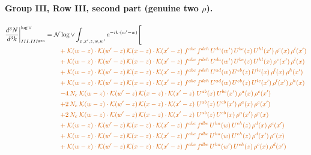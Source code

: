 \documentclass[10pt]{article}
\numberwithin{equation}{section}
\newcommand{\NNv}{\mathcal N\log\vee}
\begin{document}
\paragraph{Group III, Row III, second part (genuine two $\rho$).}
\begin{align}
\frac{d^3N}{d^3k}\bigg|^{\log\vee}_{III.III^{\rm gen}}={}&\NNv\int_{x,x',z,w,w'}e^{-ik\cdot(w'-w)}\Bigg[\notag\\
&\quad{\color{BFK}+\;\mathcal{K}(w-z)\cdot\mathcal{K}(w'-z)\,\mathcal{K}(x-z)\cdot\mathcal{K}(x'-z)\;f^{abc}\,f^{deh}\,U^{da}(w')\,U^{be}(z)\,U^{hl}(x')\,\rho^{c}(x)\,\rho^{l}(x')}\notag\\
&\quad{\color{BFK}+\;\mathcal{K}(w-z)\cdot\mathcal{K}(w'-z)\,\mathcal{K}(x-z)\cdot\mathcal{K}(x'-z)\;f^{abc}\,f^{deh}\,U^{da}(w')\,U^{be}(z)\,U^{hl}(x)\,\rho^{c}(x')\,\rho^{l}(x)}\notag\\
&\quad{\color{BFK}+\;\mathcal{K}(w-z)\cdot\mathcal{K}(w'-z)\,\mathcal{K}(x-z)\cdot\mathcal{K}(x'-z)\;f^{abc}\,f^{deh}\,U^{ad}(w)\,U^{eb}(z)\,U^{lc}(x)\,\rho^{l}(x)\,\rho^{h}(x')}\notag\\
&\quad{\color{BFK}+\;\mathcal{K}(w-z)\cdot\mathcal{K}(w'-z)\,\mathcal{K}(x-z)\cdot\mathcal{K}(x'-z)\;f^{abc}\,f^{deh}\,U^{ad}(w)\,U^{eb}(z)\,U^{lc}(x')\,\rho^{l}(x')\,\rho^{h}(x)}\notag\\
&\quad{\color{BFK}-4\,N_c\;\mathcal{K}(w-z)\cdot\mathcal{K}(w'-z)\,\mathcal{K}(x-z)\cdot\mathcal{K}(x'-z)\;U^{ab}(x)\,U^{bc}(x')\,\rho^{a}(x)\,\rho^{c}(x')}\notag\\
&\quad{\color{BFK}+2\,N_c\;\mathcal{K}(w-z)\cdot\mathcal{K}(w'-z)\,\mathcal{K}(x-z)\cdot\mathcal{K}(x'-z)\;U^{ab}(z)\,U^{cb}(x')\,\rho^{a}(x)\,\rho^{c}(x')}\notag\\
&\quad{\color{BFK}+2\,N_c\;\mathcal{K}(w-z)\cdot\mathcal{K}(w'-z)\,\mathcal{K}(x-z)\cdot\mathcal{K}(x'-z)\;U^{ab}(z)\,U^{cb}(x)\,\rho^{a}(x')\,\rho^{c}(x)}\notag\\
&\quad{\color{BFK}+\;\mathcal{K}(w-z)\cdot\mathcal{K}(w'-z)\,\mathcal{K}(x-z)\cdot\mathcal{K}(x'-z)\;f^{abc}\,f^{dbe}\,U^{ha}(w)\,U^{eh}(z)\,\rho^{d}(x)\,\rho^{c}(x')}\notag\\
&\quad{\color{BFK}+\;\mathcal{K}(w-z)\cdot\mathcal{K}(w'-z)\,\mathcal{K}(x-z)\cdot\mathcal{K}(x'-z)\;f^{abc}\,f^{dbe}\,U^{ha}(w)\,U^{eh}(z)\,\rho^{d}(x')\,\rho^{c}(x)}\notag\\
&\quad{\color{BFK}+\;\mathcal{K}(w-z)\cdot\mathcal{K}(w'-z)\,\mathcal{K}(x-z)\cdot\mathcal{K}(x'-z)\;f^{abc}\,f^{dbe}\,U^{ha}(w')\,U^{eh}(z)\,\rho^{c}(x)\,\rho^{d}(x')}\notag\\

\end{align}
\end{document}
